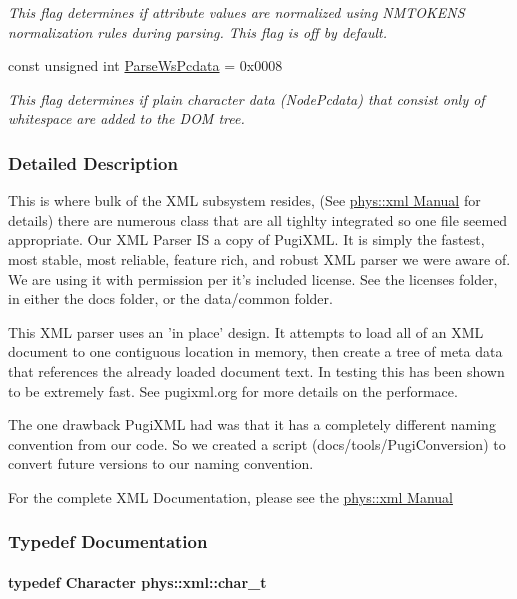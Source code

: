 \begin{DoxyCompactItemize}
\begin{DoxyCompactList}\small\item\em This flag determines if attribute values are normalized using NMTOKENS normalization rules during parsing. This flag is off by default. \item\end{DoxyCompactList}\item 
const unsigned int \hyperlink{namespacephys_1_1xml_a48c0da99d1ed62b1a4984293e64828c6}{ParseWsPcdata} = 0x0008
\begin{DoxyCompactList}\small\item\em This flag determines if plain character data (NodePcdata) that consist only of whitespace are added to the DOM tree. \item\end{DoxyCompactList}\end{DoxyCompactItemize}


\subsubsection{Detailed Description}
This is where bulk of the XML subsystem resides, (See \hyperlink{XMLManual}{phys::xml Manual} for details) there are numerous class that are all tighlty integrated so one file seemed appropriate. Our XML Parser IS a copy of PugiXML. It is simply the fastest, most stable, most reliable, feature rich, and robust XML parser we were aware of. We are using it with permission per it's included license. See the licenses folder, in either the docs folder, or the data/common folder. \par
 \par
 This XML parser uses an 'in place' design. It attempts to load all of an XML document to one contiguous location in memory, then create a tree of meta data that references the already loaded document text. In testing this has been shown to be extremely fast. See pugixml.org for more details on the performace. \par
 \par
 The one drawback PugiXML had was that it has a completely different naming convention from our code. So we created a script (docs/tools/PugiConversion) to convert future versions to our naming convention. \par
 \par
 For the complete XML Documentation, please see the \hyperlink{XMLManual}{phys::xml Manual} 

\subsubsection{Typedef Documentation}
\hypertarget{namespacephys_1_1xml_afc87705cd1c2917d87b879715a2d8f6e}{
\paragraph[{char\_\-t}]{\setlength{\rightskip}{0pt plus 5cm}typedef {\bf Character} {\bf phys::xml::char\_\-t}}\hfill}
\label{namespacephys_1_1xml_afc87705cd1c2917d87b879715a2d8f6e}



